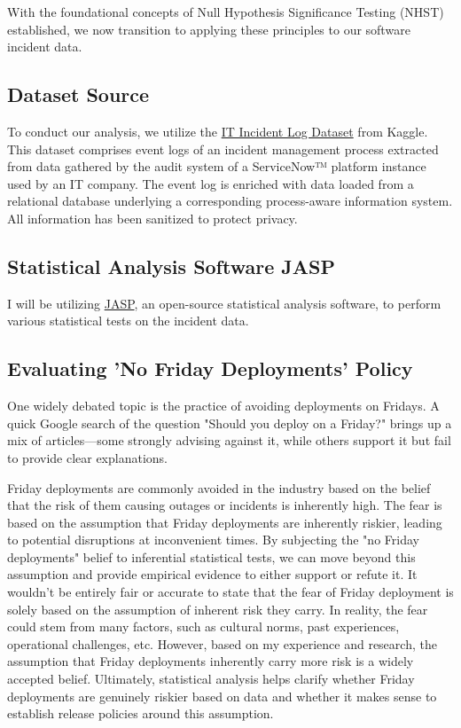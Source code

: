 \documentclass{article}
\begin{document}
With the foundational concepts of Null Hypothesis Significance Testing (NHST) established, we now transition to applying these principles to our software incident data.

\subsection{Dataset Source}

To conduct our analysis, we utilize the \href{https://www.kaggle.com/datasets/shamiulislamshifat/it-incident-log-dataset?resource=download}{IT Incident Log Dataset} from Kaggle. This dataset comprises event logs of an incident management process extracted from data gathered by the audit system of a ServiceNow™ platform instance used by an IT company. The event log is enriched with data loaded from a relational database underlying a corresponding process-aware information system. All information has been sanitized to protect privacy.

\subsection{Statistical Analysis Software JASP}

I will be utilizing \href{https://jasp-stats.org/}{JASP}, an open-source statistical analysis software, to perform various statistical tests on the incident data.

\subsection{Evaluating 'No Friday Deployments' Policy}

One widely debated topic is the practice of avoiding deployments on Fridays. A quick Google search of the question "Should you deploy on a Friday?" brings up a mix of articles—some strongly advising against it, while others support it but fail to provide clear explanations. 

Friday deployments are commonly avoided in the industry based on the belief that the risk of them causing outages or incidents is inherently high. The fear is based on the assumption that Friday deployments are inherently riskier, leading to potential disruptions at inconvenient times. By subjecting the "no Friday deployments" belief to inferential statistical tests, we can move beyond this assumption and provide empirical evidence to either support or refute it. It wouldn't be entirely fair or accurate to state that the fear of Friday deployment is solely based on the assumption of inherent risk they carry. In reality, the fear could stem from many factors, such as cultural norms, past experiences, operational challenges, etc. However, based on my experience and research, the assumption that Friday deployments inherently carry more risk is a widely accepted belief. Ultimately, statistical analysis helps clarify whether Friday deployments are genuinely riskier based on data and whether it makes sense to establish release policies around this assumption.
\end{document}
